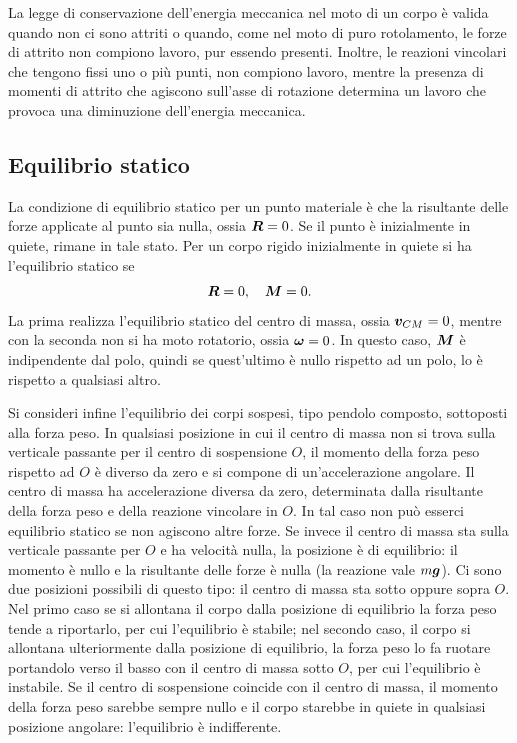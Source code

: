 La legge di conservazione dell'energia meccanica nel moto di un corpo è valida quando non ci sono attriti o quando, come nel moto di puro rotolamento, le forze di attrito non compiono lavoro, pur essendo presenti. Inoltre, le reazioni vincolari che tengono fissi uno o più punti, non compiono lavoro, mentre la presenza di momenti di attrito che agiscono sull'asse di rotazione determina un lavoro che provoca una diminuzione dell'energia meccanica. 

\subsection{Equilibrio statico}
La condizione di equilibrio statico per un punto materiale è che la risultante delle forze applicate al punto sia nulla, ossia $\bm{R}=0$. Se il punto è inizialmente in quiete, rimane in tale stato. Per un corpo rigido inizialmente in quiete si ha l'equilibrio statico se
\begin{equation}
    \bm{R}=0,\quad\bm{M}=0.
\end{equation}
La prima realizza l'equilibrio statico del centro di massa, ossia $\bm{v}_{CM}=0$, mentre con la seconda non si ha moto rotatorio, ossia $\bm{\omega}=0$. In questo caso, $\bm{M}$ è indipendente dal polo, quindi se quest'ultimo è nullo rispetto ad un polo, lo è rispetto a qualsiasi altro. 

Si consideri infine l'equilibrio dei corpi sospesi, tipo pendolo composto, sottoposti alla forza peso. In qualsiasi posizione in cui il centro di massa non si trova sulla verticale passante per il centro di sospensione $O$, il momento della forza peso rispetto ad $O$ è diverso da zero e si compone di un'accelerazione angolare. Il centro di massa ha accelerazione diversa da zero, determinata dalla risultante della forza peso e della reazione vincolare in $O$. In tal caso non può esserci equilibrio statico se non agiscono altre forze. Se invece il centro di massa sta sulla verticale passante per $O$ e ha velocità nulla, la posizione è di equilibrio: il momento è nullo e la risultante delle forze è nulla (la reazione vale $m\bm{g}$). Ci sono due posizioni possibili di questo tipo: il centro di massa sta sotto oppure sopra $O$. Nel primo caso se si allontana il corpo dalla posizione di equilibrio la forza peso tende a riportarlo, per cui l'equilibrio è stabile; nel secondo caso, il corpo si allontana ulteriormente dalla posizione di equilibrio, la forza peso lo fa ruotare portandolo verso il basso con il centro di massa sotto $O$, per cui l'equilibrio è instabile. Se il centro di sospensione coincide con il centro di massa, il momento della forza peso sarebbe sempre nullo e il corpo starebbe in quiete in qualsiasi posizione angolare: l'equilibrio è indifferente. 